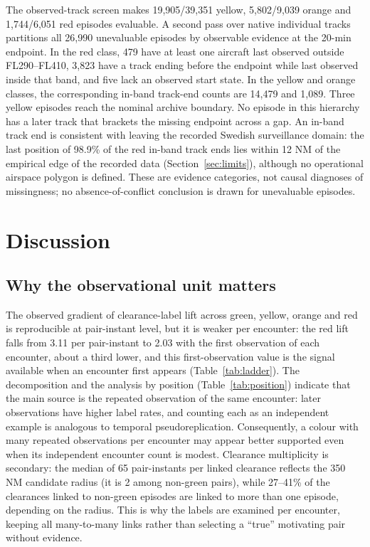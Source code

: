 \documentclass[aerospace,article,submit,moreauthors]{Definitions/mdpi}
\begin{document}
The observed-track screen makes 19,905/39,351 yellow, 5,802/9,039 orange and 1,744/6,051 red episodes evaluable. A second pass over native individual tracks partitions all 26,990 unevaluable episodes by observable evidence at the 20-min endpoint. In the red class, 479 have at least one aircraft last observed outside FL290--FL410, 3,823 have a track ending before the endpoint while last observed inside that band, and five lack an observed start state. In the yellow and orange classes, the corresponding in-band track-end counts are 14,479 and 1,089. Three yellow episodes reach the nominal archive boundary. No episode in this hierarchy has a later track that brackets the missing endpoint across a gap. An in-band track end is consistent with leaving the recorded Swedish surveillance domain: the last position of 98.9\% of the red in-band track ends lies within 12 NM of the empirical edge of the recorded data (Section~\ref{sec:limits}), although no operational airspace polygon is defined. These are evidence categories, not causal diagnoses of missingness; no absence-of-conflict conclusion is drawn for unevaluable episodes.

\section{Discussion}\label{sec:discussion}
\subsection{Why the observational unit matters}
The observed gradient of clearance-label lift across green, yellow, orange and red is reproducible at pair-instant level, but it is weaker per encounter: the red lift falls from 3.11 per pair-instant to 2.03 with the first observation of each encounter, about a third lower, and this first-observation value is the signal available when an encounter first appears (Table~\ref{tab:ladder}). The decomposition and the analysis by position (Table~\ref{tab:position}) indicate that the main source is the repeated observation of the same encounter: later observations have higher label rates, and counting each as an independent example is analogous to temporal pseudoreplication. Consequently, a colour with many repeated observations per encounter may appear better supported even when its independent encounter count is modest. Clearance multiplicity is secondary: the median of 65 pair-instants per linked clearance reflects the 350 NM candidate radius (it is 2 among non-green pairs), while 27--41\% of the clearances linked to non-green episodes are linked to more than one episode, depending on the radius. This is why the labels are examined per encounter, keeping all many-to-many links rather than selecting a ``true'' motivating pair without evidence.
\end{document}
